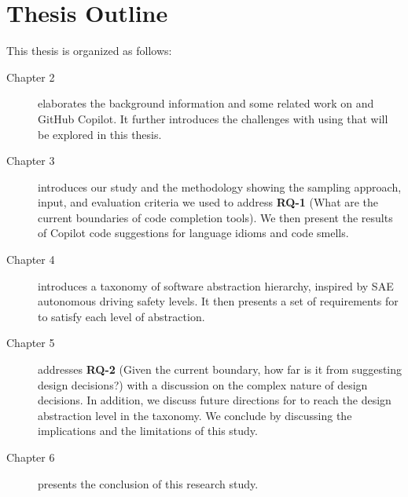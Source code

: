 \section{Thesis Outline}

This thesis is organized as follows:

\begin{description}
\item[Chapter 2] elaborates the background information and some related work on \cct{} and GitHub Copilot. It further introduces the challenges with using \cct{} that will be explored in this thesis.
\item[Chapter 3] introduces our study and the methodology showing the sampling approach, input, and evaluation criteria we used to address \textbf{RQ-1} (What are the current boundaries of code completion tools).
We then present the results of Copilot code suggestions for language idioms and code smells.
\item[Chapter 4] introduces a taxonomy of software abstraction hierarchy, inspired by SAE autonomous driving safety levels. It then presents a set of requirements for \cct{} to satisfy each level of abstraction.
\item[Chapter 5] addresses \textbf{RQ-2} (Given the current boundary, how far is it from suggesting design decisions?) with a discussion on the complex nature of design decisions. In addition, we discuss future directions for \cct{} to reach the design abstraction level in the taxonomy. 
We conclude by discussing the implications and the limitations of this study.
\item[Chapter 6] presents the conclusion of this research study.
\end{description}